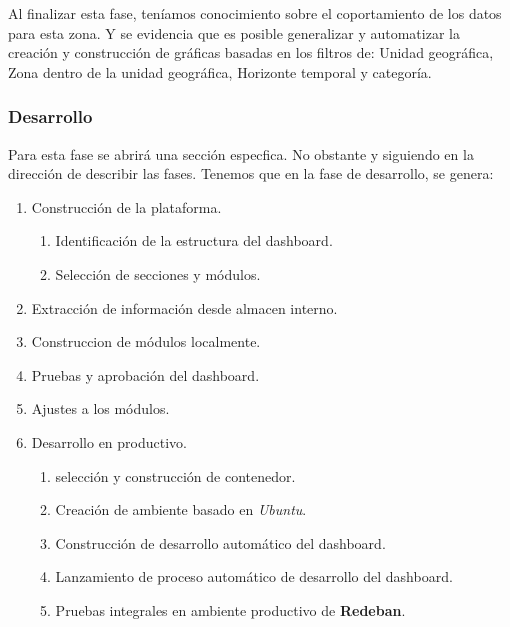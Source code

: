\documentclass[a4paper]{article}
\begin{document}
Al finalizar esta fase, teníamos conocimiento sobre el coportamiento de los datos para esta zona. Y se evidencia que es posible generalizar y automatizar la creación y construcción de gráficas basadas en los filtros de: Unidad geográfica, Zona dentro de la unidad geográfica, Horizonte temporal y categoría.

\subsubsection{Desarrollo}

Para esta fase se abrirá una sección especfica. No obstante y siguiendo en la dirección de describir las fases. Tenemos que en la fase de desarrollo, se genera:

\begin{enumerate}
	\item Construcción de la plataforma.
	\begin{enumerate}
		\item Identificación de la estructura del dashboard.
		\item Selección de secciones y módulos.
	\end{enumerate}
	\item Extracción de información desde almacen interno.
	\item Construccion de módulos localmente.
	\item Pruebas y aprobación del dashboard.
	\item Ajustes a los módulos.
	\item Desarrollo en productivo.
	\begin{enumerate}
		\item selección y construcción de contenedor.
		\item Creación de ambiente basado en \textit{Ubuntu}.
		\item Construcción de desarrollo automático del dashboard.
		\item Lanzamiento de proceso automático de desarrollo del dashboard.
		\item Pruebas integrales en ambiente productivo de \textbf{Redeban}.
	\end{enumerate}
\end{enumerate}

\\
\end{document}
